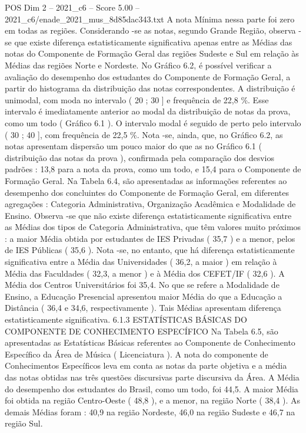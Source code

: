 \begin{textsample}{POS Dim 2 – 2021\_c6 – Score 5.00 – 2021\_c6/enade\_2021\_mus\_8d85dac343.txt}
A nota Mínima nessa parte foi zero em todas as regiões.
Considerando -se as notas, segundo Grande Região, observa -se que existe diferença estatisticamente significativa apenas entre as Médias das notas do Componente de Formação Geral das regiões Sudeste e Sul em relação às Médias das regiões Norte e Nordeste.
No Gráfico 6.2, é possível verificar a avaliação do desempenho dos estudantes do Componente de Formação Geral, a partir do histograma da distribuição das notas correspondentes.
A distribuição é unimodal, com moda no intervalo ( 20 ; 30 ] e frequência de 22,8 \%.
Esse intervalo é imediatamente anterior ao modal da distribuição de notas da prova, como um todo ( Gráfico 6.1 ).
O intervalo modal é seguido de perto pelo intervalo ( 30 ; 40 ], com frequência de 22,5 \%.
Nota -se, ainda, que, no Gráfico 6.2, as notas apresentam dispersão um pouco maior do que as no Gráfico 6.1 ( distribuição das notas da prova ), confirmada pela comparação dos desvios padrões : 13,8 para a nota da prova, como um todo, e 15,4 para o Componente de Formação Geral.
Na Tabela 6.4, são apresentadas as informações referentes ao desempenho dos concluintes do Componente de Formação Geral, em diferentes agregações : Categoria Administrativa, Organização Acadêmica e Modalidade de Ensino.
Observa -se que não existe diferença estatisticamente significativa entre as Médias dos tipos de Categoria Administrativa, que têm valores muito próximos : a maior Média obtida por estudantes de IES Privadas ( 35,7 ) e a menor, pelos de IES Públicas ( 35,6 ).
Nota -se, no entanto, que há diferença estatisticamente significativa entre a Média das Universidades ( 36,2, a maior ) em relação à Média das Faculdades ( 32,3, a menor ) e à Média dos CEFET/IF ( 32,6 ).
A Média dos Centros Universitários foi 35,4.
No que se refere a Modalidade de Ensino, a Educação Presencial apresentou maior Média do que a Educação a Distância ( 36,4 e 34,6, respectivamente ).
Tais Médias apresentam diferença estatisticamente significativa. 6.1.3 ESTATÍSTICAS BÁSICAS DO COMPONENTE DE CONHECIMENTO ESPECÍFICO Na Tabela 6.5, são apresentadas as Estatísticas Básicas referentes ao Componente de Conhecimento Específico da Área de Música ( Licenciatura ).
A nota do componente de Conhecimentos Específicos leva em conta as notas da parte objetiva e a média das notas obtidas nas três questões discursivas parte discursiva da Área.
A Média do desempenho dos estudantes do Brasil, como um todo, foi 44,5.
A maior Média foi obtida na região Centro-Oeste ( 48,8 ), e a menor, na região Norte ( 38,4 ).
As demais Médias foram : 40,9 na região Nordeste, 46,0 na região Sudeste e 46,7 na região Sul.

\end{textsample}

